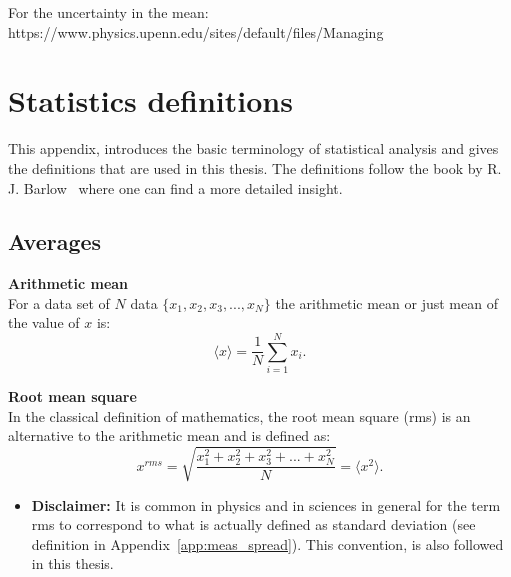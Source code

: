 For the uncertainty in the mean:
https://www.physics.upenn.edu/sites/default/files/Managing%

\section{Statistics definitions}\label{app:statistics_definitions}
This appendix, introduces the basic terminology of statistical analysis and gives the definitions that are used in this thesis. The definitions follow the book by R. J. Barlow~\cite{lvp.b313005720130101} where one can find a more detailed insight.

\subsection{Averages}
\normalsize{\textbf{Arithmetic mean}}\\
For a data set of $N$ data $\{ x_1, x_2, x_3, ..., x_N \}$ the arithmetic mean or just mean of the value of $x$ is:
\begin{equation}\label{eq:mean_def}
    \langle x \rangle = \frac{1}{N} \sum_{i=1}^{N} x_i.
\end{equation}

\normalsize{\textbf{Root mean square}}\\
In the classical definition of mathematics, the root mean square (rms) is an alternative to the arithmetic mean and is defined as:
\begin{equation}\label{eq:rms_def}
    x^{rms} = \sqrt{\frac{x_1^2+x_2^2+x_3^2+...+x_N^2}{N}}=\langle x^2 \rangle.
\end{equation}
\begin{itemize}
\item \textbf{Disclaimer:} It is common in physics and in sciences in general for the term rms to correspond to what is actually defined as standard deviation (see definition in Appendix~\ref{app:meas_spread}). This convention, is also followed in this thesis.
\end{itemize}
